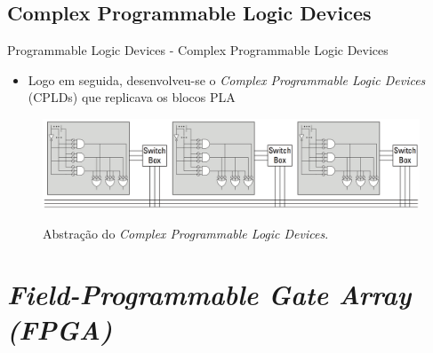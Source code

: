 \documentclass[aspectratio=169]{beamer}
\begin{document}
	\subsection{Complex Programmable Logic Devices}
	\begin{frame}{Programmable Logic Devices - Complex Programmable Logic Devices}
		
		\begin{itemize}
			\item Logo em seguida, desenvolveu-se o \textit{Complex Programmable Logic Devices} (CPLDs) que replicava os blocos PLA
		\end{itemize}
		
		\begin{figure}[h]
			\centering
			\caption{Abstração do \textit{Complex Programmable Logic Devices}.}
			\includegraphics[height=0.42\textheight]{img/print/cpld.png}
			\label{fig:cpls}
		\end{figure}
	\end{frame}
	
\section{\it{Field-Programmable Gate Array} (FPGA)}
\end{document}
